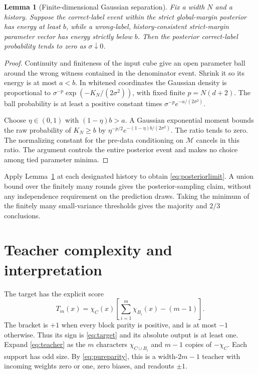 \documentclass[11pt]{article}
\newtheorem{lemma}[theorem]{Lemma}
\begin{document}
\begin{lemma}[Finite-dimensional Gaussian separation]\label{lem:laplace}
Fix a width $N$ and a history. Suppose the correct-label event within
the strict global-margin posterior has energy at least $b$, while a
wrong-label, history-consistent strict-margin parameter vector has
energy strictly below $b$. Then the posterior correct-label
probability tends to zero as $\sigma\downarrow0$.
\end{lemma}
\begin{proof}
Continuity and finiteness of the input cube give an open parameter
ball around the wrong witness contained in the denominator event.
Shrink it so its energy is at most $a<b$. In whitened coordinates
the Gaussian density is proportional to
$\sigma^{-p}\exp(-K_N/(2\sigma^2))$, with fixed finite
$p=N(d+2)$. The ball probability is at least a positive constant times
$\sigma^{-p}e^{-a/(2\sigma^2)}$.

Choose $\eta\in(0,1)$ with $(1-\eta)b>a$. A Gaussian exponential
moment bounds the raw probability of $K_N\ge b$ by
$\eta^{-p/2}e^{-(1-\eta)b/(2\sigma^2)}$. The ratio tends to zero.
The normalizing constant for the pre-data conditioning on
$\mathcal M$ cancels in this ratio. The argument controls the entire
posterior event and makes no choice among tied parameter minima.
\end{proof}

Apply Lemma~\ref{lem:laplace} at each designated history to obtain
\eqref{eq:posteriorlimit}. A union bound over the finitely many rounds
gives the posterior-sampling claim, without any independence
requirement on the prediction draws. Taking the minimum of the
finitely many small-variance thresholds gives the majority and
$2/3$ conclusions.

\section{Teacher complexity and interpretation}

The target has the explicit score
\begin{equation}\label{eq:teacher}
 T_m(x)=\chi_C(x)\left[\sum_{i=1}^m\chi_{B_i}(x)-(m-1)\right].
\end{equation}
The bracket is $+1$ when every block parity is positive, and is at
most $-1$ otherwise. Thus its sign is \eqref{eq:target} and its
absolute output is at least one. Expand \eqref{eq:teacher} as the
$m$ characters $\chi_{C\cup B_i}$ and $m-1$ copies of
$-\chi_C$. Each support has odd size. By \eqref{eq:pureparity}, this
is a width-$2m-1$ teacher with incoming weights zero or one, zero
biases, and readouts $\pm1$.
\end{document}
